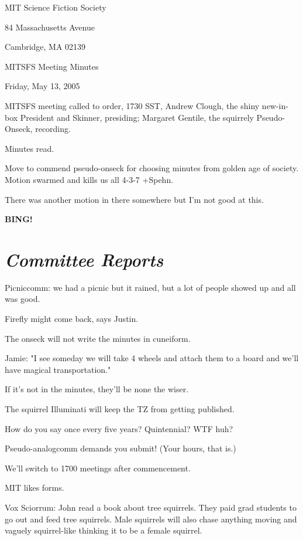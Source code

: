 \documentclass[10pt]{article}
\newcommand{\bing}{{\bf BING!} }
\newcommand{\goto}[1]{\bing \vskip 12pt \section*{{\em{#1}}}}
\begin{document}
\begin{center}

MIT Science Fiction Society 

84 Massachusetts Avenue

Cambridge, MA 02139

\vspace{12pt}

MITSFS Meeting Minutes 

Friday, May 13, 2005

\end{center}
 
\vspace{18pt}

\setlength{\parskip}{6pt}

\noindent
MITSFS meeting called to order, 1730 SST, Andrew Clough, the shiny new-in-box President and
Skinner, presiding; Margaret Gentile, the squirrely Pseudo-Onseck, recording.

Minutes read.

Move to commend pseudo-onseck for choosing minutes from golden age of society. Motion swarmed and kills us all 4-3-7 +Spehn.

There was another motion in there somewhere but I'm not good at this.

\goto{Committee Reports}

Picniccomm: we had a picnic but it rained, but a lot of people showed up and all was good.

Firefly might come back, says Justin.

The onseck will not write the minutes in cuneiform.

Jamie: "I see someday we will take 4 wheels and attach them to a board and we'll have magical transportation."

If it's not in the minutes, they'll be none the wiser.

The squirrel Illuminati will keep the TZ from getting published.

How do you say once every five years? Quintennial? WTF huh?

Pseudo-analogcomm demands you submit! (Your hours, that is.)

We'll switch to 1700 meetings after commencement.

MIT likes forms.

Vox Sciorrum: John read a book about tree squirrels. They paid grad students to go out and feed tree squirrels. Male squirrels will also chase anything moving and vaguely squirrel-like thinking it to be a female squirrel.
\end{document}

